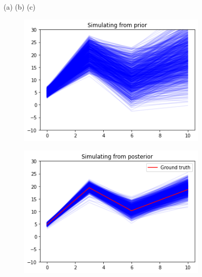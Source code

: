 \documentclass[12pt]{extreport}
\begin{document}
\begin{figure}
    \begin{minipage}{15cm}
        \small (a)  \hspace{4.3cm}  (b) \hspace{4.3cm}  (c)  
    \end{minipage}
 \centering

    \begin{subfigure}{.32\textwidth}
        \centering
        \includegraphics[width=1.\linewidth]{prior_piecewise.png}
    \end{subfigure}
    \begin{subfigure}{.32\textwidth}
        \centering
        \includegraphics[width=1.\linewidth]{piecewise_ppc_snpe_final.png}
    \end{subfigure}
    \begin{subfigure}{.32\textwidth}

\end{subfigure}
\end{figure}
\end{document}
